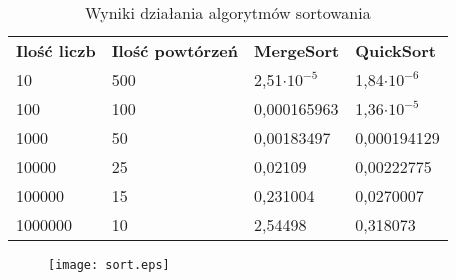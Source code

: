 \documentclass[a4paper,10pt]{article}
\begin{document}
\begin{center}
\begin{table}[h]
\caption{Wyniki działania algorytmów sortowania}
\begin{tabular}{llll}
\textbf{Ilość liczb} & \textbf{Ilość powtórzeń} & \textbf{MergeSort} & \textbf{QuickSort}\\
10 & 500 & 2,51\(\cdot 10^{-5}\) & 1,84\(\cdot 10^{-6}\)\\
100 & 100 & 0,000165963 & 1,36\(\cdot 10^{-5}\)\\
1000 & 50 & 0,00183497 & 0,000194129\\
10000 & 25 & 0,02109 & 0,00222775\\
100000 & 15 & 0,231004 & 0,0270007\\
1000000 & 10 & 2,54498 & 0,318073
\end{tabular}

\end{table}
\end{center}

\begin{figure}[h]
 \texttt{[image: sort.eps]}
\end{figure}
\end{document}
